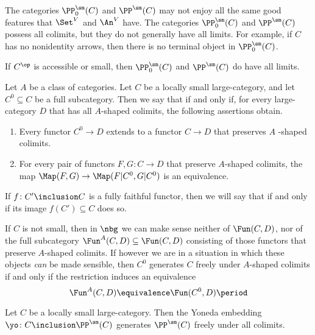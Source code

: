 \begin{nul}
	The categories $ \PP^{\sm}_0(C) $ and $ \PP^{\sm}(C) $
	may not enjoy all the same good features that
	$ \Set^V $ and $ \An^V$ have.
	The categories $ \PP^{\sm}_0(C) $ and $ \PP^{\sm}(C) $
	possess all colimits,
	but they do not generally have all limits.
	For example, if $C$ has no nonidentity arrows, then
	there is no terminal object in $ \PP^{\sm}_0(C) $.
	
	If $ C^{\op} $ is accessible or small,
	then $ \PP^{\sm}_0(C) $ and $ \PP^{\sm}(C) $ do have all limits.
\end{nul}

\begin{definition}
	Let $ A $ be a class of categories.
	Let $ C $ be a locally small large-category,
	and let $ C^0 \subseteq C $ be a full subcategory.
	Then we say that
	if and only if,
	for every large-category $ D $
	that has all $ A $-shaped colimits,
	the following assertions obtain.
	\begin{enumerate}
		\item Every functor $ C^0 \to D $ extends
			to a functor $ C \to D $
			that preserves $ A $ -shaped colimits.
		\item For every pair of functors
			$ F, G \colon C \to D $
			that preserve $ A $-shaped colimits,
			the map
			$ \Map(F, G) \to \Map(F|C^0, G|C^0 ) $
			is an equivalence.
	\end{enumerate}
	If $ f \colon C' \inclusion C $ is a fully faithful functor,
	then we will say that
	if and only if its image $ f(C') \subseteq C $ does so.
\end{definition}

\begin{remark}
	If $ C $ is not small, then in $ \nbg $
	we can make sense neither of $ \Fun(C,D) $,
	nor of the full subcategory
	$ \Fun^{A}(C, D) \subseteq \Fun(C,D) $
	consisting of those functors that preserve
	$ A $-shaped colimits.
	If however we are in a situation in which
	these objects \emph{can} be made sensible,
	then $ C^0 $ generates $ C $ freely under
	$ A $-shaped colimits
	if and only if the restriction induces an equivalence
	\[
		\Fun^A(C, D) \equivalence \Fun(C^0, D) \period
	\]
\end{remark}

\begin{proposition}%
	\label{prp:PPsmisfreelygenerated}
	Let $ C $ be a locally small large-category.
	Then the Yoneda embedding
	$ \yo \colon C \inclusion \PP^{\sm}(C) $
	generates $ \PP^{\sm}(C) $ freely under all colimits.
\end{proposition}

